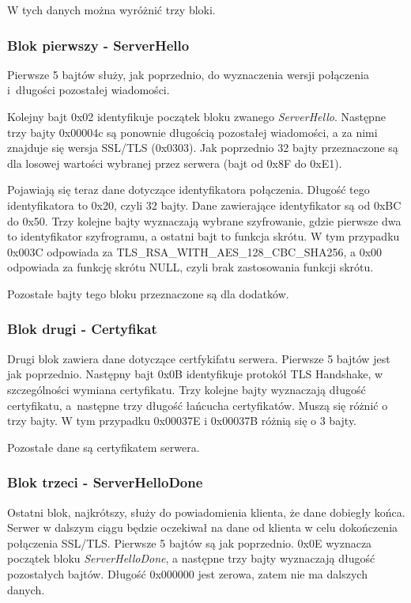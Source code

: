 \documentclass[12pt,twoside,a4]{mwbk}
\theoremstyle{definition}
\begin{document}
W tych danych można wyróżnić trzy bloki.

\subsubsection{Blok pierwszy - ServerHello}
Pierwsze 5 bajtów służy, jak poprzednio, do wyznaczenia wersji połączenia i~długości pozostałej wiadomości. \\ \par

Kolejny bajt 0x02 identyfikuje początek bloku zwanego \textit{ServerHello}. Następne trzy bajty 0x00004c są ponownie długością pozostałej wiadomości, a za nimi znajduje się wersja SSL/TLS (0x0303). Jak poprzednio 32 bajty przeznaczone są dla losowej wartości wybranej przez serwera (bajt od 0x8F do 0xE1). \\ \par

Pojawiają się teraz dane dotyczące identyfikatora połączenia. Długość tego identyfikatora to 0x20, czyli 32 bajty. Dane zawierające identyfikator są od 0xBC do 0x50. Trzy kolejne bajty wyznaczają wybrane szyfrowanie, gdzie pierwsze dwa to identyfikator szyfrogramu, a ostatni bajt to funkcja skrótu. W tym przypadku 0x003C odpowiada za TLS\_RSA\_WITH\_AES\_128\_CBC\_SHA256, a 0x00 odpowiada za funkcję skrótu NULL, czyli brak zastosowania funkcji skrótu. \\ \par

Pozostałe bajty tego bloku przeznaczone są dla dodatków.

\subsubsection{Blok drugi - Certyfikat}
Drugi blok zawiera dane dotyczące certfykifatu serwera. Pierwsze 5 bajtów jest jak poprzednio. Następny bajt 0x0B identyfikuje protokół TLS Handshake, w szczególności wymiana certyfikatu. Trzy kolejne bajty wyznaczają długość certyfikatu, a~następne trzy długość łańcucha certyfikatów. Muszą się różnić o trzy bajty. W tym przypadku 0x00037E i 0x00037B różnią się o 3 bajty. \\ \par

Pozostałe dane są certyfikatem serwera.

\subsubsection{Blok trzeci - ServerHelloDone}
Ostatni blok, najkrótszy, służy do powiadomienia klienta, że dane dobiegły końca. Serwer w dalszym ciągu będzie oczekiwał na dane od klienta w celu dokończenia połączenia SSL/TLS. Pierwsze 5 bajtów są jak poprzednio. 0x0E wyznacza początek bloku \textit{ServerHelloDone}, a następne trzy bajty wyznaczają długość pozostałych bajtów. Długość 0x000000 jest zerowa, zatem nie ma dalszych danych.
\end{document}
